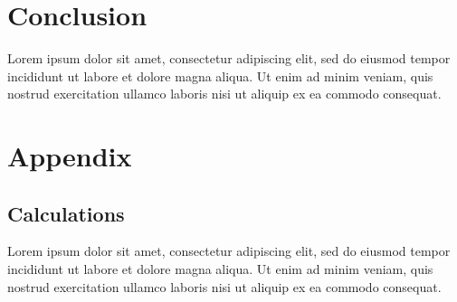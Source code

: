 \documentclass{article}
\renewcommand\appendix{\par
  \setcounter{section}{0}
  \setcounter{subsection}{0}
  \setcounter{figure}{0}
  \setcounter{table}{0}
  \renewcommand\thesection{Appendix \Alph{section}}
  \renewcommand\thefigure{\Alph{section}\arabic{figure}}
  \renewcommand\thetable{\Alph{section}\arabic{table}}
}
\begin{document}
\section{Conclusion}

Lorem ipsum dolor sit amet, consectetur adipiscing elit, sed do eiusmod tempor incididunt ut labore et dolore magna aliqua. Ut enim ad minim veniam, quis nostrud exercitation ullamco laboris nisi ut aliquip ex ea commodo consequat.


\clearpage
\doublespacing

 
\pagebreak

\appendix
\onehalfspacing
\section*{Appendix}
\renewcommand{\thesubsection}{\Alph{subsection}}

\subsection{Calculations}
Lorem ipsum dolor sit amet, consectetur adipiscing elit, sed do eiusmod tempor incididunt ut labore et dolore magna aliqua. Ut enim ad minim veniam, quis nostrud exercitation ullamco laboris nisi ut aliquip ex ea commodo consequat.
\end{document}
